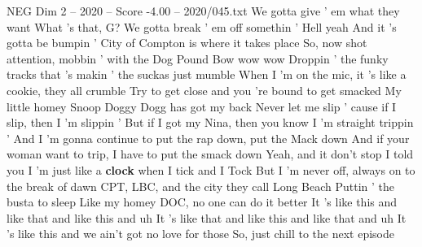 \begin{textsample}{NEG Dim 2 – 2020 – Score -4.00 – 2020/045.txt}
We gotta give ' em what they want What 's that, G?
We gotta break ' em off somethin ' Hell yeah And it 's gotta be bumpin ' City of Compton is where it takes place So, now shot attention, mobbin ' with the Dog Pound Bow wow wow Droppin ' the funky tracks that 's makin ' the suckas just mumble When I 'm on the mic, it 's like a cookie, they all crumble Try to get close and you 're bound to get smacked My little homey Snoop Doggy Dogg has got my back Never let me slip ' cause if I slip, then I 'm slippin ' But if I got my Nina, then you know I 'm straight trippin ' And I 'm gonna continue to put the rap down, put the Mack down And if your woman want to trip, I have to put the smack down Yeah, and it don't stop I told you I 'm just like a \textbf{clock} when I tick and I Tock But I 'm never off, always on to the break of dawn CPT, LBC, and the city they call Long Beach Puttin ' the busta to sleep Like my homey DOC, no one can do it better It 's like this and like that and like this and uh It 's like that and like this and like that and uh It 's like this and we ain't got no love for those So, just chill to the next episode

\end{textsample}
